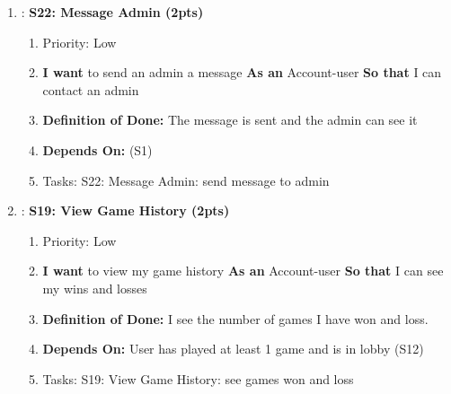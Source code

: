 \begin{enumerate}
    \item: \textbf{S22: Message Admin (2pts)}
    \begin{enumerate}
        \item Priority: Low 
        \item \textbf{I want} to send an admin a message \textbf{As an} Account-user \textbf{So that} I can contact an admin
        \item \textbf{Definition of Done:} The message is sent and the admin can see it
        \item \textbf{Depends On:} (S1)
        \item Tasks: S22: Message Admin: send message to admin
    \end{enumerate}


    \item: \textbf{S19: View Game History (2pts)}
    \begin{enumerate}
        \item Priority: Low
        \item \textbf{I want} to view my game history \textbf{As an} Account-user \textbf{So that} I can see my wins and losses
        \item \textbf{Definition of Done:} I see the number of games I have won and loss.
        \item \textbf{Depends On:} User has played at least 1 game and is in lobby (S12)
        \item Tasks: S19: View Game History: see games won and loss
    \end{enumerate}
    
\end{enumerate}

